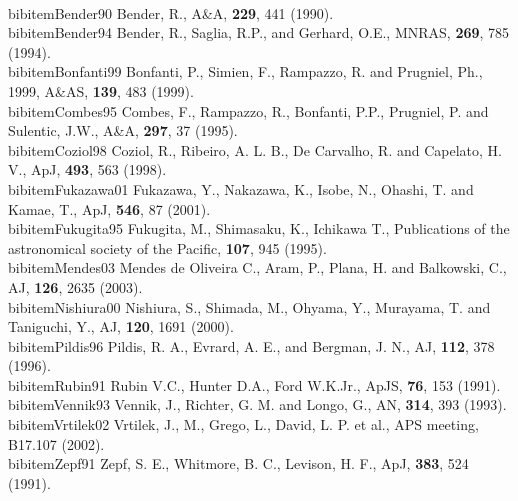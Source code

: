 \\bibitem{Bender90} Bender, R., A\&A, {\bf 229}, 441
(1990).
\\bibitem{Bender94} Bender, R., Saglia, R.P., and Gerhard, O.E., MNRAS, {\bf 269},
785 (1994).
\\bibitem{Bonfanti99} Bonfanti, P., Simien, F., Rampazzo, R. and Prugniel, Ph., 1999, A\&AS, {\bf 139},
483 (1999).
\\bibitem{Combes95} Combes, F., Rampazzo, R., Bonfanti, P.P., Prugniel, P. and Sulentic, J.W., A\&A, {\bf 297},
37 (1995).
\\bibitem{Coziol98} Coziol, R., Ribeiro, A. L. B., De Carvalho, R. and Capelato, H. V., ApJ, {\bf 493},
563 (1998).
\\bibitem{Fukazawa01} Fukazawa, Y., Nakazawa, K., Isobe, N., Ohashi, T. and Kamae, T., ApJ, {\bf 546},
87 (2001).
\\bibitem{Fukugita95} Fukugita, M., Shimasaku, K., Ichikawa T., Publications of the astronomical society of the Pacific, {\bf 107},
945 (1995).
\\bibitem{Mendes03} Mendes de Oliveira C., Aram, P., Plana, H. and Balkowski, C., AJ, {\bf 126},
2635 (2003).
\\bibitem{Nishiura00} Nishiura, S., Shimada, M., Ohyama, Y., Murayama, T. and Taniguchi, Y., AJ, {\bf 120},
1691 (2000).
\\bibitem{Pildis96} Pildis, R. A., Evrard, A. E., and Bergman, J. N., AJ, {\bf 112},
378 (1996).
\\bibitem{Rubin91} Rubin V.C., Hunter D.A., Ford W.K.Jr., ApJS, {\bf 76}, 153 (1991).
\\bibitem{Vennik93} Vennik, J., Richter, G. M. and Longo, G., AN, {\bf 314},
393 (1993).
\\bibitem{Vrtilek02} Vrtilek, J., M., Grego, L., David, L. P. et al., APS meeting,
B17.107 (2002).
\\bibitem{Zepf91} Zepf, S. E., Whitmore, B. C., Levison, H. F., ApJ, {\bf 383},
524 (1991).


